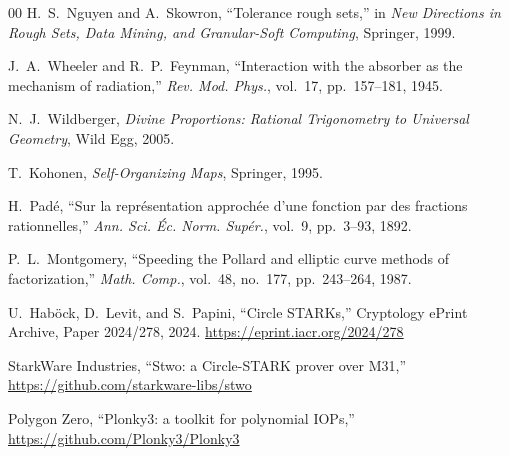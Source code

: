 \documentclass[conference]{IEEEtran}
\begin{document}
\begin{thebibliography}{00}
H.~S.~Nguyen and A.~Skowron,
``Tolerance rough sets,''
in \emph{New Directions in Rough Sets, Data Mining, and Granular-Soft Computing},
Springer, 1999.

J.~A.~Wheeler and R.~P.~Feynman,
``Interaction with the absorber as the mechanism of radiation,''
\emph{Rev. Mod. Phys.}, vol.~17, pp.~157--181, 1945.

N.~J.~Wildberger,
\emph{Divine Proportions: Rational Trigonometry to Universal Geometry},
Wild Egg, 2005.

T.~Kohonen,
\emph{Self-Organizing Maps},
Springer, 1995.

H.~Pad\'{e},
``Sur la repr\'{e}sentation approch\'{e}e d'une fonction par des fractions rationnelles,''
\emph{Ann. Sci. \'{E}c. Norm. Sup\'{e}r.}, vol.~9, pp.~3--93, 1892.

P.~L.~Montgomery,
``Speeding the Pollard and elliptic curve methods of factorization,''
\emph{Math. Comp.}, vol.~48, no.~177, pp.~243--264, 1987.

U.~Hab\"{o}ck, D.~Levit, and S.~Papini,
``Circle STARKs,''
Cryptology ePrint Archive, Paper 2024/278, 2024.
\url{https://eprint.iacr.org/2024/278}

StarkWare Industries,
``Stwo: a Circle-STARK prover over M31,''
\url{https://github.com/starkware-libs/stwo}

Polygon Zero,
``Plonky3: a toolkit for polynomial IOPs,''
\url{https://github.com/Plonky3/Plonky3}

\end{thebibliography}
\end{document}
